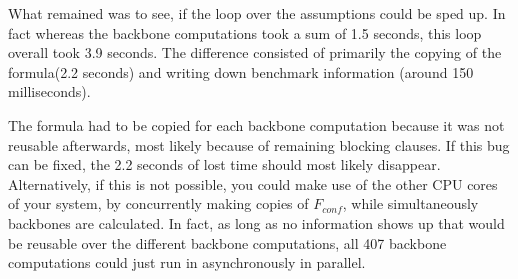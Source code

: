 What remained was to see, if the loop over the assumptions could be sped up. In fact whereas the backbone computations took a sum of 1.5 seconds, this loop overall took 3.9 seconds. The difference consisted of primarily the copying of the formula(2.2 seconds) and writing down benchmark information (around 150 milliseconds). 

The formula had to be copied for each backbone computation because it was not reusable afterwards, most likely because of remaining blocking clauses. If this bug can be fixed, the 2.2 seconds of lost time should most likely disappear. Alternatively, if this is not possible, you could make use of the other CPU cores of your system, by concurrently making copies of $F_{conf}$, while simultaneously backbones are calculated. In fact, as long as no information shows up that would be reusable over the different backbone computations, all 407 backbone computations could just run in asynchronously in parallel.